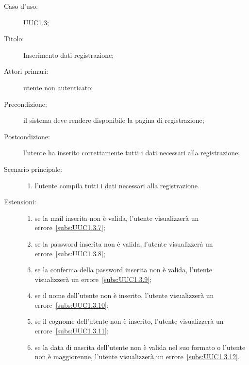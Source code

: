\documentclass[../../../analisi-dei-requisiti.tex]{subfiles}
\begin{document}
\begin{description}
  \item[Caso d'uso:] UUC1.3;
  \item[Titolo:] Inserimento dati registrazione;
  \item[Attori primari:] utente non autenticato;
  \item[Precondizione:] il sistema deve rendere disponibile la pagina di registrazione;
  \item[Postcondizione:] l'utente ha inserito correttamente tutti i dati necessari alla registrazione;
  \item[Scenario principale:]
        \begin{enumerate}
          \item l'utente compila tutti i dati necessari alla registrazione.
        \end{enumerate}
  \item[Estensioni:]
        \begin{enumerate}
          \item se la mail inserita non è valida, l'utente visualizzerà un errore~\ref{subs:UUC1.3.7};
          \item se la password inserita non è valida, l'utente visualizzerà un errore~\ref{subs:UUC1.3.8};
          \item se la conferma della password inserita non è valida, l'utente visualizzerà un errore~\ref{subs:UUC1.3.9};
          \item se il nome dell'utente non è inserito, l'utente visualizzerà un errore~\ref{subs:UUC1.3.10};
          \item se il cognome dell'utente non è inserito, l'utente visualizzerà un errore~\ref{subs:UUC1.3.11};
          \item se la data di nascita dell'utente non è valida nel suo formato o l'utente non è maggiorenne, l'utente visualizzerà un errore~\ref{subs:UUC1.3.12}.
        \end{enumerate}
\end{description}
\end{document}
